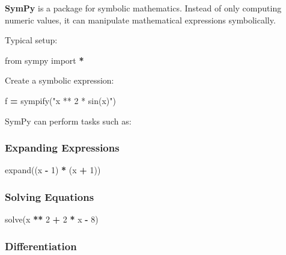 \documentclass[
]{article}
\newenvironment{Shaded}{\begin{snugshade}}{\end{snugshade}}
\newcommand{\DecValTok}[1]{\textcolor[rgb]{0.00,0.00,0.81}{#1}}
\newcommand{\ImportTok}[1]{#1}
\newcommand{\NormalTok}[1]{#1}
\newcommand{\OperatorTok}[1]{\textcolor[rgb]{0.81,0.36,0.00}{\textbf{#1}}}
\newcommand{\StringTok}[1]{\textcolor[rgb]{0.31,0.60,0.02}{#1}}
\begin{document}
\textbf{SymPy} is a package for symbolic mathematics. Instead of only
computing numeric values, it can manipulate mathematical expressions
symbolically.

Typical setup:

\begin{Shaded}
\begin{Highlighting}[]
\ImportTok{from}\NormalTok{ sympy }\ImportTok{import} \OperatorTok{*}
\end{Highlighting}
\end{Shaded}

Create a symbolic expression:

\begin{Shaded}
\begin{Highlighting}[]
\NormalTok{f }\OperatorTok{=}\NormalTok{ sympify(}\StringTok{"x ** 2 * sin(x)"}\NormalTok{)}
\end{Highlighting}
\end{Shaded}

SymPy can perform tasks such as:

\subsubsection{Expanding Expressions}\label{expanding-expressions}

\begin{Shaded}
\begin{Highlighting}[]
\NormalTok{expand((x }\OperatorTok{{-}} \DecValTok{1}\NormalTok{) }\OperatorTok{*}\NormalTok{ (x }\OperatorTok{+} \DecValTok{1}\NormalTok{))}
\end{Highlighting}
\end{Shaded}

\subsubsection{Solving Equations}\label{solving-equations}

\begin{Shaded}
\begin{Highlighting}[]
\NormalTok{solve(x }\OperatorTok{**} \DecValTok{2} \OperatorTok{+} \DecValTok{2} \OperatorTok{*}\NormalTok{ x }\OperatorTok{{-}} \DecValTok{8}\NormalTok{)}
\end{Highlighting}
\end{Shaded}

\subsubsection{Differentiation}\label{differentiation}
\end{document}
